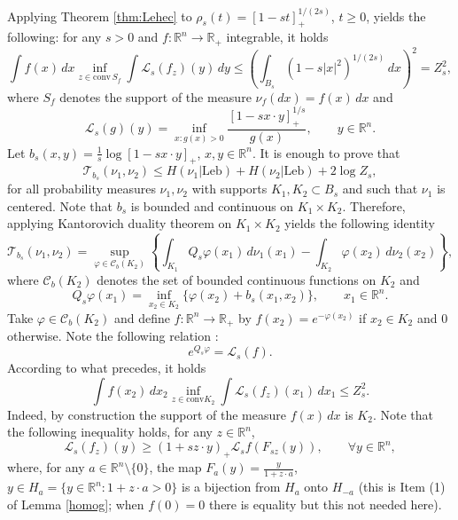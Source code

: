 \documentclass[10pt]{amsart}
\theoremstyle{definition}
\theoremstyle{remark}
\newcommand{\R}{\mathbb{R}}
\begin{document}
Applying Theorem \ref{thm:Lehec} to $\rho_s(t) = [1-s t]_+^{1/(2s)}$, $t\geq0$, yields the following: for any $s>0$ and $f : \R^n \to \R_+$ integrable, it holds 
\[
\int f(x) \,dx \inf_{z\in \mathrm{conv}\,S_f} \int \mathcal{L}_s(f_z)(y)\,dy \leq \left(\int_{B_{s}} \left(1 - s |x|^2\right)^{1/(2 s)}\,dx\right)^2 = Z_s^2,
\]
where $S_f$ denotes the support of the measure $\nu_f(dx) = f(x)\,dx$ and 
\[
 \mathcal{L}_s(g)(y) = \inf_{x : g(x)>0} \frac{[1-s x\cdot y]_+^{1/s}}{g(x)},\qquad y\in \R^n.
\]
Let $b_s(x,y) = \frac{1}{s} \log [1-s x\cdot y]_+$, $x,y \in \R^n$.
It is enough to prove that
\begin{equation}\label{eq:Tbs}
\mathcal{T}_{b_s} (\nu_1,\nu_2) \leq H(\nu_1 |  \mathrm{Leb}) + H(\nu_2 |  \mathrm{Leb}) + 2\log Z_s,
\end{equation}
for all probability measures $\nu_1,\nu_2$ with supports  $K_1,K_2 \subset B_{s}$ and such that $\nu_1$ is centered.
Note that $b_s$ is bounded and continuous on $K_1 \times K_2$. Therefore, applying Kantorovich duality theorem on $K_1\times K_2$ yields the following identity
\begin{equation}\label{eq:dualityTbs}
\mathcal{T}_{b_s}(\nu_1,\nu_2) = \sup_{\varphi \in \mathcal{C}_b(K_2)}\left\{ \int_{K_1} Q_s \varphi(x_1) \,d\nu_1(x_1) - \int_{K_2} \varphi(x_2)\,d\nu_2(x_2)\right\},
\end{equation}
where $\mathcal{C}_b(K_2)$ denotes the set of bounded continuous functions on $K_2$ and 
\[
Q_s \varphi(x_1) = \inf_{x_2 \in K_2} \{\varphi(x_2) + b_s(x_1,x_2)\},\qquad x_1 \in \R^n.
\]
Take $\varphi \in \mathcal{C}_b(K_2)$ and define $f : \R^n \to \R_+$ by $f(x_2) = e^{-\varphi(x_2)}$ if $x_2 \in K_2$ and $0$ otherwise.
Note the following relation :
\begin{equation}\label{eq:Qtbs}
e^{Q_s \varphi} = \mathcal{L}_s(f).
\end{equation}
According to what precedes, it holds 
\[
\int f(x_2)\,dx_2 \inf_{z \in \mathrm{conv} K_2} \int \mathcal{L}_s(f_z)(x_1)\,dx_1 \leq Z_s^2.
\]
Indeed, by construction the support of the measure $f(x)\,dx$ is $K_2$.
Note that the following inequality holds, for any $z\in \R^n$,
\[
\mathcal{L}_s(f_z)(y) \geq (1+s z\cdot y)_+ \mathcal{L}_s f(F_{s z}(y)),\qquad \forall y\in \R^n,
\]
where, for any $a \in \R^n \setminus \{0\}$, the map $F_{a}(y) = \frac{y}{1+z\cdot a}$, $y \in H_{a} = \{y \in \R^n : 1+z\cdot a>0\}$ is a bijection from $H_{a}$ onto $H_{-a}$ (this is Item (1) of Lemma \ref{homog}; when $f(0)=0$ there is equality but this not needed here).
\end{document}
